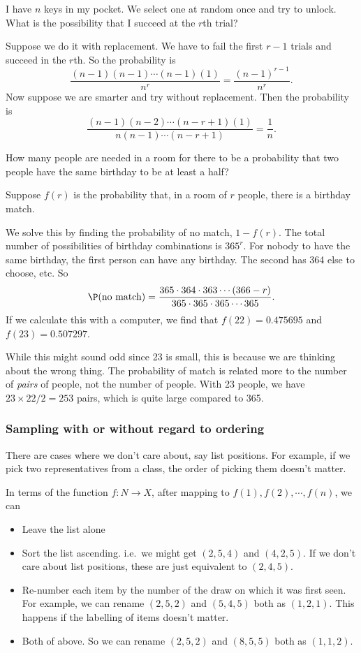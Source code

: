 \documentclass[a4paper]{article}
\begin{document}
\begin{eg}
  I have $n$ keys in my pocket. We select one at random once and try to unlock. What is the possibility that I succeed at the $r$th trial?

  Suppose we do it with replacement. We have to fail the first $r - 1$ trials and succeed in the $r$th. So the probability is
  \[
    \frac{(n - 1)(n - 1) \cdots (n - 1)(1)}{n^r} = \frac{(n - 1)^{r - 1}}{n^r}.
  \]
  Now suppose we are smarter and try without replacement. Then the probability is
  \[
    \frac{(n - 1)(n - 2)\cdots (n - r + 1)(1)}{n(n - 1) \cdots (n - r + 1)} = \frac{1}{n}.
  \]
\end{eg}
\begin{eg}
  How many people are needed in a room for there to be a probability that two people have the same birthday to be at least a half?

  Suppose $f(r)$ is the probability that, in a room of $r$ people, there is a birthday match.

  We solve this by finding the probability of no match, $1 - f(r)$. The total number of possibilities of birthday combinations is $365^r$. For nobody to have the same birthday, the first person can have any birthday. The second has 364 else to choose, etc. So
  \[
    \P(\text{no match}) = \frac{365\cdot 364\cdot 363 \cdots (366 - r)}{365\cdot 365\cdot 365 \cdots 365}.
  \]
  If we calculate this with a computer, we find that $f(22) = 0.475695$ and $f(23) = 0.507297$.

  While this might sound odd since 23 is small, this is because we are thinking about the wrong thing. The probability of match is related more to the number of \emph{pairs} of people, not the number of people. With 23 people, we have $23\times 22/2 = 253$ pairs, which is quite large compared to 365.
\end{eg}
\subsubsection*{Sampling with or without regard to ordering}
There are cases where we don't care about, say list positions. For example, if we pick two representatives from a class, the order of picking them doesn't matter.

In terms of the function $f: N\to X$, after mapping to $f(1), f(2), \cdots, f(n)$, we can
\begin{itemize}
  \item Leave the list alone
  \item Sort the list ascending. i.e.\ we might get $(2, 5, 4)$ and $(4, 2, 5)$. If we don't care about list positions, these are just equivalent to $(2, 4, 5)$.
  \item Re-number each item by the number of the draw on which it was first seen. For example, we can rename $(2, 5, 2)$ and $(5, 4, 5)$ both as $(1, 2, 1)$. This happens if the labelling of items doesn't matter.
  \item Both of above. So we can rename $(2, 5, 2)$ and $(8, 5, 5)$ both as $(1, 1, 2)$.
\end{itemize}
\end{document}

